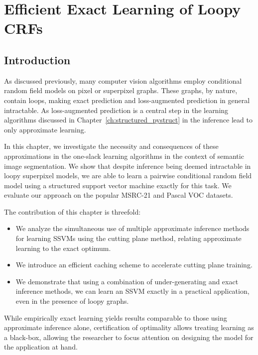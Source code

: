 \chapter{Efficient Exact Learning of Loopy CRFs}

\section{Introduction}
As discussed previously, %
 many computer vision algorithms employ conditional random
field models on pixel or superpixel graphs. These graphs, by nature, contain loops,
making exact prediction and loss-augmented prediction in general intractable.
As loss-augmented prediction is a central step in the learning algorithms
discussed in Chapter~\ref{ch:structured_pystruct}
in the inference lead to only approximate learning.

In this chapter, we investigate the necessity and consequences of these
approximations in the one-slack learning algorithms in the context of semantic
image segmentation. We show that despite inference being deemed intractable in
loopy superpixel models, we are able to learn a pairwise conditional random
field model using a structured support vector machine exactly for this task.
We evaluate our approach on the popular MSRC-21 and Pascal VOC datasets. %

The contribution of this chapter is threefold:
\begin{itemize}
    \item We analyze the simultaneous use of multiple approximate inference
        methods for learning SSVMs using the cutting plane method, relating
        approximate learning to the exact optimum.
    \item We introduce an efficient caching scheme to accelerate cutting plane
        training.
    \item We demonstrate that using a combination of under-generating and exact
        inference methods, we can learn an SSVM exactly in a practical
        application, even in the presence of loopy graphs.
\end{itemize}

While empirically exact learning yields results comparable to those using
approximate inference alone, certification of optimality allows treating
learning as a black-box, allowing the researcher to focus attention on
designing the model for the application at hand.


